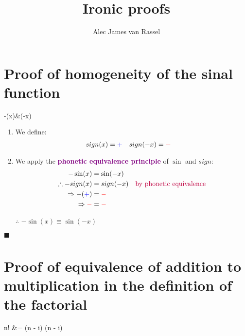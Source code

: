 \documentclass[12pt, titlepage,french]{article}
\begin{document}
\title{Ironic proofs}
\vspace{-8ex}
\date{}
\author{Alec James van Rassel}
\maketitle

\tableofcontents
\setcounter{secnumdepth}{-1}

\clearpage

\section{Proof of homogeneity of the sinal function}

\begin{theorems}[Theorem]
	-\sin(x)&\equiv	\sin(-x) 
\end{theorems}

\begin{distributions}[Proof]
\begin{enumerate}
	\item	We define:
		\begin{align*}
		sign(x)	&=	\textcolor{blue}{+}	&
		sign(-x)	&=	\textcolor{red}{-}
		\end{align*}
	\item	We apply the \textcolor{purple}{\textbf{phonetic equivalence principle}} of $\sin$ and $sign$:
		\begin{align*}
						-\sin(x)					&=	\sin(-x)	\\		
		\therefore	-sign(x)					&=	sign(-x)		\quad	\text{\textcolor{purple}{by phonetic equivalence}}\\		
		\Rightarrow	-(\textcolor{blue}{+})	&=	\textcolor{red}{-}	\\		
		\Rightarrow	\textcolor{red}{-}		&=	\textcolor{red}{-}	
		\end{align*}		
	\item[$\therefore$]	$-\sin(x)\equiv	\sin(-x)$
\end{enumerate}
\end{distributions}
$\blacksquare$

\clearpage

\section{Proof of equivalence of addition to multiplication in the definition of the factorial}

\begin{theorems}[Theorem]
	n!	
	&=	 (n - i)	
	\equiv		{} (n - i)	
\end{theorems}
\end{document}
